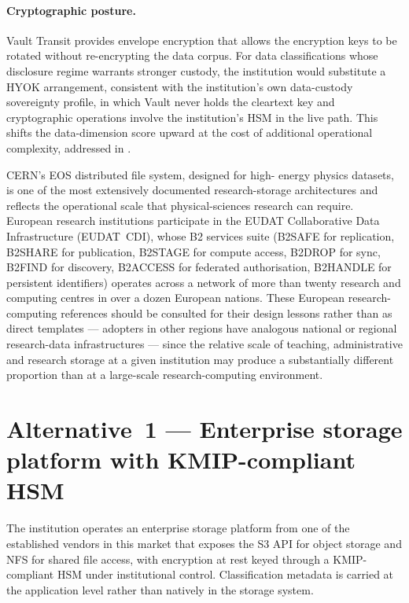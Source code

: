 \paragraph{Cryptographic posture.} Vault Transit provides envelope
encryption that allows the encryption keys to be rotated without
re-encrypting the data corpus. For data classifications whose
disclosure regime warrants stronger custody, the institution would
substitute a HYOK arrangement, consistent with the institution's own
data-custody sovereignty profile, in which Vault never holds the
cleartext key and cryptographic operations involve the institution's
HSM in the live path. This shifts the data-dimension score upward
at the cost of additional operational complexity, addressed in
.

\begin{realworldbox}
\noindent CERN's EOS distributed file system, designed for high-
energy physics datasets, is one of the most extensively documented
research-storage architectures and reflects the operational scale
that physical-sciences research can require. European research
institutions participate in the EUDAT Collaborative Data
Infrastructure (EUDAT~CDI), whose B2 services suite (B2SAFE for
replication, B2SHARE for publication, B2STAGE for compute access,
B2DROP for sync, B2FIND for discovery, B2ACCESS for federated
authorisation, B2HANDLE for persistent identifiers) operates
across a network of more than twenty research and computing
centres in over a dozen European nations. These European research-computing references should
be consulted for their design lessons rather than as direct
templates --- adopters in other regions have analogous national or
regional research-data infrastructures --- since the relative scale
of teaching, administrative and research storage at a given
institution may produce a substantially different proportion than
at a large-scale research-computing environment.
\end{realworldbox}

\section{Alternative~1 --- Enterprise storage platform with KMIP-compliant HSM}
\label{sec:st-alt1}

\begin{alternativebox}
\noindent The institution operates an enterprise storage platform
from one of the established vendors in this market that exposes the
S3 API for object
storage and NFS for shared file access, with encryption at rest
keyed through a KMIP-compliant HSM under institutional control.
Classification metadata is carried at the application level rather
than natively in the storage system.
\end{alternativebox}

